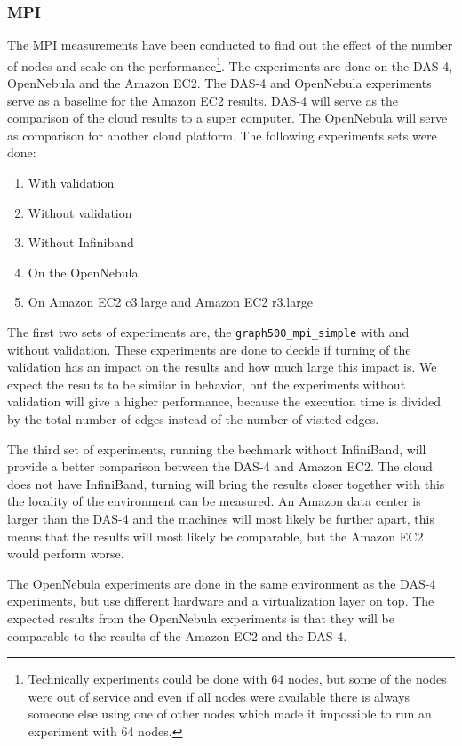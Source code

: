 \subsubsection{MPI}
\label{med:mpi}
The MPI measurements have been conducted to find out the effect of the number of nodes and scale on the performance\footnote{Technically experiments could be done with 64 nodes, but some of the nodes were out of service and even if all nodes were available there is always someone else using one of other nodes which made it impossible to run an experiment with 64 nodes.}.
The experiments are done on the DAS-4, OpenNebula and the Amazon EC2. The DAS-4 and OpenNebula experiments serve as a baseline for the Amazon EC2 results. DAS-4 will serve as the comparison of the cloud results to a super computer. The OpenNebula will serve as comparison for another cloud platform. The following experiments sets were done:
\begin{enumerate}
	\item With validation
	\item Without validation
	\item Without Infiniband
	\item On the OpenNebula
	\item On Amazon EC2 c3.large and Amazon EC2 r3.large 
\end{enumerate}

The first two sets of experiments are, the \texttt{graph500\_mpi\_simple} with and without validation. These experiments are done to decide if turning of the validation has an impact on the results and how much large this impact is. We expect the results to be similar in behavior, but the experiments without validation will give a higher performance, because the execution time is divided by the total number of edges instead of the number of visited edges.

The third set of experiments, running the bechmark without InfiniBand, will provide a better comparison between the DAS-4 and Amazon EC2. The cloud does not have InfiniBand, turning will bring the results closer together with this the locality of the environment can be measured. An Amazon data center is larger than the DAS-4 and the machines will most likely be further apart, this means that the results will most likely be comparable, but the Amazon EC2 would perform worse.

The OpenNebula experiments are done in the same environment as the DAS-4 experiments, but use different hardware and a virtualization layer on top. The expected results from the OpenNebula experiments is that they will be comparable to the results of the Amazon EC2 and the DAS-4.

